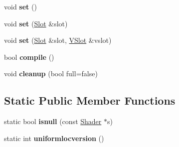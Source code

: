 \begin{DoxyCompactItemize}
void {\bfseries set} ()
\item 
\mbox{\label{struct_shader_a6f7a5446ef6ed34852141342b11645e4}} 
void {\bfseries set} (\hyperlink{struct_slot}{Slot} \&slot)
\item 
\mbox{\label{struct_shader_a43fad44d662e65005703626867dbaece}} 
void {\bfseries set} (\hyperlink{struct_slot}{Slot} \&slot, \hyperlink{struct_v_slot}{V\+Slot} \&vslot)
\item 
\mbox{\label{struct_shader_a75512fd8255dc4442d65f1fde2d5feb2}} 
bool {\bfseries compile} ()
\item 
\mbox{\label{struct_shader_adc295a24f30329ef7b5a3e841442dfb8}} 
void {\bfseries cleanup} (bool full=false)
\end{DoxyCompactItemize}
\subsection*{Static Public Member Functions}
\begin{DoxyCompactItemize}
\item 
\mbox{\label{struct_shader_a121af31ed5e1593a6e94cca201d7d666}} 
static bool {\bfseries isnull} (const \hyperlink{struct_shader}{Shader} $\ast$s)
\item 
\mbox{\label{struct_shader_ac6fe7462b240ce7ea99cb9d9db1e8c79}} 
static int {\bfseries uniformlocversion} ()
\end{DoxyCompactItemize}
